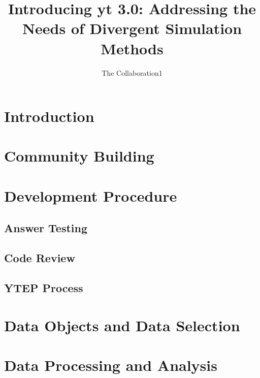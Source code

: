 \documentclass{emulateapj}
\begin{document}
\title{Introducing yt 3.0: Addressing the Needs of Divergent Simulation
Methods}
\author{The \yt{} Collaboration{1}}
\email{}

\begin{abstract}
\end{abstract}

\keywords{}


\maketitle

\section{Introduction}

\section{Community Building}

\section{Development Procedure}

\subsection{Answer Testing}

\subsection{Code Review}

\subsection{YTEP Process}

\section{Data Objects and Data Selection}

\section{Data Processing and Analysis}
\end{document}
